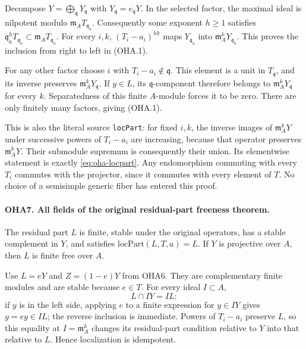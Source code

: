 Decompose \(Y=\bigoplus_{\mathfrak q}Y_{\mathfrak q}\) with
\(Y_{\mathfrak q}=e_{\mathfrak q}Y\). In the selected factor,
the maximal ideal is nilpotent modulo \(\mathfrak m_AT_{\mathfrak q_a}\).
Consequently some exponent \(h\ge1\) satisfies
\(\mathfrak q_a^hT_{\mathfrak q_a}
 \subset\mathfrak m_AT_{\mathfrak q_a}\).
For every \(i,k\), \((T_i-a_i)^{hk}\) maps
\(Y_{\mathfrak q_a}\) into \(\mathfrak m_A^kY_{\mathfrak q_a}\).
This proves the inclusion from right to left in (OHA.1).

For any other factor choose \(i\) with \(T_i-a_i\notin\mathfrak q\).
This element is a unit in \(T_{\mathfrak q}\), and its inverse
preserves \(\mathfrak m_A^kY_{\mathfrak q}\).
If \(y\in L\), its \(\mathfrak q\)-component therefore belongs
to \(\mathfrak m_A^kY_{\mathfrak q}\) for every \(k\).
Separatedness of this finite \(A\)-module forces it to be zero.
There are only finitely many factors, giving (OHA.1).

This is also the literal source \texttt{locPart}: for fixed
\(i,k\), the inverse images of \(\mathfrak m_A^kY\) under
successive powers of \(T_i-a_i\) are increasing, because
that operator preserves \(\mathfrak m_A^kY\). Their submodule
supremum is consequently their union. Its elementwise statement
is exactly \eqref{eq:oha-locpart}.
Any endomorphism commuting with every \(T_i\) commutes with
the projector, since it commutes with every element of \(T\).
No choice of a semisimple generic fiber has entered this proof.

\paragraph{OHA7. All fields of the original residual-part freeness theorem.}
\label{claim:OHA7}
The residual part \(L\) is finite, stable under the original
operators, has a stable complement in \(Y\), and satisfies
\(\mathrm{locPart}(L,T,a)=L\). If \(Y\) is projective over \(A\),
then \(L\) is finite free over \(A\).

Use \(L=eY\) and \(Z=(1-e)Y\) from OHA6. They are complementary
finite modules and are stable because \(e\in T\). For every ideal
\(I\subset A\),
\[
                       L\cap IY=IL:
\]
if \(y\) is in the left side, applying \(e\) to a finite expression
for \(y\in IY\) gives \(y=ey\in IL\); the reverse inclusion is
immediate. Powers of \(T_i-a_i\) preserve \(L\), so this equality
at \(I=\mathfrak m_A^k\) changes its residual-part condition
relative to \(Y\) into that relative to \(L\). Hence localization
is idempotent.

